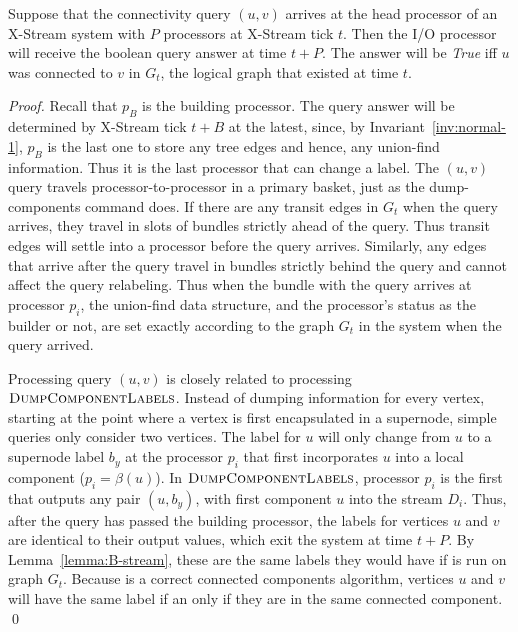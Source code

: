 \begin{theorem}
Suppose that the connectivity query $(u,v)$ arrives at the head processor of an X-Stream
system with $P$ processors at X-Stream tick $t$. Then the I/O processor will
receive the boolean query answer at time $t+P$.  The answer will be \emph{True}
iff $u$ was connected to $v$ in $G_t$, the logical graph that existed at time $t$.
\label{thm:query-correctness}
\end{theorem}
\begin{proof}
Recall that $p_B$ is the building processor.
The query answer will be determined by
X-Stream tick $t+B$ at the latest, since, by Invariant~\ref{inv:normal-1},  
$p_B$ is the last
one to store any tree edges and hence, any union-find information.  Thus it is the 
last processor that can change a label. The $(u,v)$ query travels processor-to-processor in a primary basket, just as
the dump-components command does. If there are any transit edges in $G_t$ when the query arrives, they travel in slots of bundles strictly ahead of the query. Thus transit edges will settle into a processor before the query arrives.  Similarly, any edges that arrive after the query travel in bundles strictly behind the query and cannot affect the query relabeling. Thus when the bundle with the query arrives at processor $p_i$, the union-find data structure, and the processor's status as the builder or not, are set exactly according to the graph $G_t$ in the system when the query arrived.

Processing query $(u,v)$ is closely related to processing $\Call{DumpComponentLabels}{}$. Instead of dumping information for every vertex, starting at the point where a vertex is first encapsulated in a supernode, simple queries only consider two vertices. The label for $u$ will only change from $u$ to a supernode label $b_y$ at the processor $p_i$ that first incorporates $u$ into a local component ($p_i = \beta(u)$).  In $\Call{DumpComponentLabels}{}$, processor $p_i$ is the first that outputs any pair $(u, b_y)$, with first component $u$ into the stream $D_i$.  Thus, after the query has passed the building processor, the labels for vertices $u$ and $v$ are identical to their output values, which exit the system at time $t+P$. By Lemma~\ref{lemma:B-stream}, these are the same labels they would have if \DFR is run on graph $G_t$.  Because \DFR is a correct connected components algorithm, vertices $u$ and $v$ will have the same label if an only if they are in the same connected component. \qed
\end{proof}

